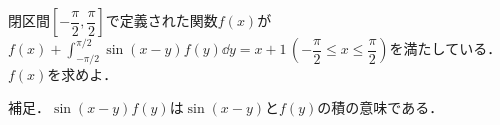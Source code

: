 \documentclass[../../main.tex]{subfiles}
\begin{document}
閉区間$\left[-\dfrac{\pi}{2},\dfrac{\pi}{2}\right]$で定義された関数$f(x)$が${\displaystyle f(x)+\int_{-\pi/2}^{\pi/2}\sin (x-y)f(y)\dd y=x+1\, \left(-\dfrac{\pi}{2}\le x \le \dfrac{\pi}{2}\right)}$を満たしている．
$f(x)$を求めよ．

補足．$\sin (x-y)f(y)$は$\sin (x-y)$と$f(y)$の積の意味である．
\end{document}
